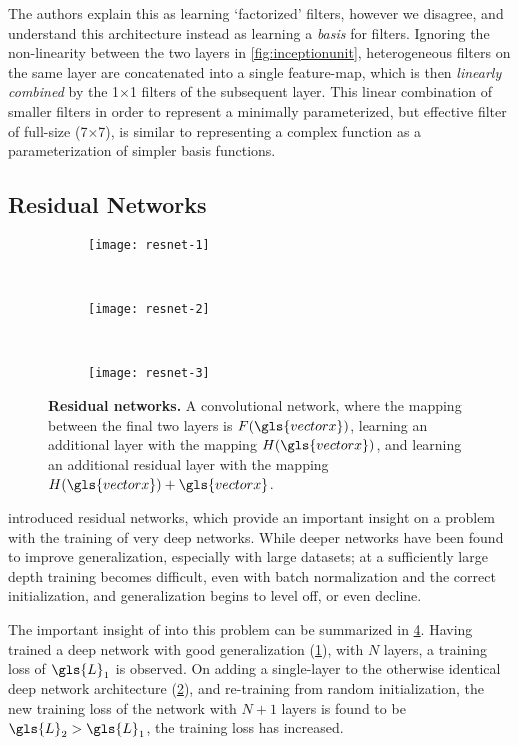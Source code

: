 \documentclass[thesis]{subfiles}
\begin{document}
The authors explain this as learning `factorized' filters, however we disagree, and understand this architecture instead as learning a \emph{basis} for filters. Ignoring the non-linearity between the two layers in \cref{fig:inceptionunit}, heterogeneous filters on the same layer are concatenated into a single feature-map, which is then \emph{linearly combined} by the 1$\times$1 filters of the subsequent layer. This linear combination of smaller filters in order to represent a minimally parameterized, but effective filter of full-size (7$\times$7), is similar to representing a complex function as a parameterization of simpler basis functions.

\subsection{Residual Networks}\label{residualnetworks}
\begin{figure}[tbp]
\begin{subfigure}[T]{0.32\textwidth}
\centering
\texttt{[image: resnet-1]}
\caption{}\label{fig:resnet-1}
\end{subfigure}
~
\begin{subfigure}[T]{0.32\textwidth}
\centering
\texttt{[image: resnet-2]}
\caption{}\label{fig:resnet-2}
\end{subfigure}
~
\begin{subfigure}[T]{0.32\textwidth}
\centering
\texttt{[image: resnet-3]}
\caption{}\label{fig:resnet-3}
\end{subfigure}
\caption[Residual networks]{\textbf{Residual networks.}  A convolutional network, where the mapping between the final two layers is $F(\gls{vectorx})$,  learning an additional layer with the mapping $H(\gls{vectorx})$, and  learning an additional residual layer with the mapping $H(\gls{vectorx})+\gls{vectorx}$.}
\label{fig:resnet}
\end{figure}
\citet{He2015} introduced residual networks, which provide an important insight on a problem with the training of very deep networks. While deeper networks have been found to improve generalization, especially with large datasets; at a sufficiently large depth training becomes difficult, even with batch normalization and the correct initialization, and generalization begins to level off, or even decline.

The important insight of \citet{He2015} into this problem can be summarized in \cref{fig:resnet}. Having trained a deep network with good generalization (\ie \cref{fig:resnet-1}), with $N$ layers, a training loss of $\gls{L}_1$ is observed. On adding a single-layer to the otherwise identical deep network architecture (\ie \cref{fig:resnet-2}), and re-training from random initialization, the new training loss of the network with $N+1$ layers is found to be $\gls{L}_2 > \gls{L}_1$, \ie the training loss has increased.
\end{document}
